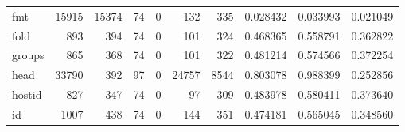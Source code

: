 \begin{longtable}{lrrrrrrrrr}
fmt       &                               15915 &                                           15374 &                                             74 &                                             0 &                                            132 &                                          335 &                                           0.028432 &                               0.033993 &                             0.021049 \\
fold      &                                 893 &                                             394 &                                             74 &                                             0 &                                            101 &                                          324 &                                           0.468365 &                               0.558791 &                             0.362822 \\
groups    &                                 865 &                                             368 &                                             74 &                                             0 &                                            101 &                                          322 &                                           0.481214 &                               0.574566 &                             0.372254 \\
head      &                               33790 &                                             392 &                                             97 &                                             0 &                                          24757 &                                         8544 &                                           0.803078 &                               0.988399 &                             0.252856 \\
hostid    &                                 827 &                                             347 &                                             74 &                                             0 &                                             97 &                                          309 &                                           0.483978 &                               0.580411 &                             0.373640 \\
id        &                                1007 &                                             438 &                                             74 &                                             0 &                                            144 &                                          351 &                                           0.474181 &                               0.565045 &                             0.348560 \\

\end{longtable}
